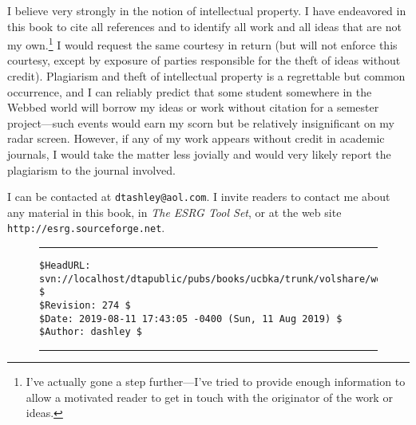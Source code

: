 I  believe very
strongly in the notion of intellectual property.  I have endeavored
in this book to cite all references and to identify all work and
all ideas that are not my own.\footnote{I've actually gone a step
further---I've tried to provide enough information to allow a
motivated reader to get in touch with the originator of the work
or ideas.}  I would request the same courtesy in return (but will
not enforce this courtesy, except by exposure of parties responsible
for the theft of ideas without credit).  Plagiarism and theft of intellectual property is a 
regrettable but common occurrence, and I can
reliably predict that some student somewhere in the Webbed world
will borrow my ideas or work without citation
for a semester project---such events would earn my scorn 
but be relatively insignificant
on my radar screen.  However, if any of my work appears without
credit in academic journals, I would take the matter less
jovially and would very likely report the plagiarism to the journal 
involved.

I 
can be contacted at \texttt{dtashley@aol.com}.  I invite readers
to contact me about
any material in this book, in \emph{The ESRG Tool Set}, or at
the web site \texttt{http://esrg.sourceforge.net}.


\noindent\begin{figure}[!b]
\noindent\rule[-0.25in]{\textwidth}{1pt}
\begin{tiny}
\begin{verbatim}
$HeadURL: svn://localhost/dtapublic/pubs/books/ucbka/trunk/volshare/workprfa.tex $
$Revision: 274 $
$Date: 2019-08-11 17:43:05 -0400 (Sun, 11 Aug 2019) $
$Author: dashley $
\end{verbatim}
\end{tiny}
\noindent\rule[0.25in]{\textwidth}{1pt}
\end{figure}
%
